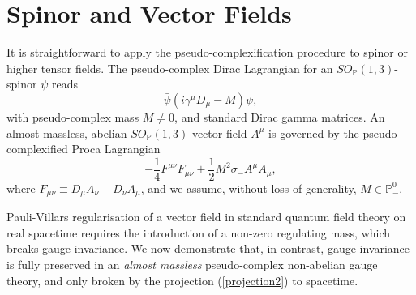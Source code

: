 \documentclass[a4paper,aps,prd,showkeys,showpacs,superscriptaddress,preprint]{revtex4}
\newcommand{\pc}{\mathbb{P}}
\begin{document}
\section{Spinor and Vector Fields\label{sec_gaugetheory}}
It is straightforward to apply the pseudo-complexification
procedure to spinor or higher tensor fields. The pseudo-complex Dirac
Lagrangian for an $SO_\pc(1,3)$-spinor $\psi$ reads
\begin{equation}
  \bar \psi(i \gamma^\mu D_\mu - M) \psi,
\end{equation}
with pseudo-complex mass $M\neq 0$, and standard Dirac gamma
matrices. An almost massless, abelian $SO_\pc(1,3)$-vector field
$A^\mu$ is governed by the pseudo-complexified Proca Lagrangian
\begin{equation}
  -\frac{1}{4} F^{\mu\nu}F_{\mu\nu} + \frac{1}{2} M^2 \sigma_- A^\mu A_\mu,
\end{equation} 
where $F_{\mu\nu} \equiv D_\mu A_\nu - D_\nu A_\mu$, and we assume,
without loss of generality, $M \in \pc^0_-$. 

Pauli-Villars regularisation of a vector field in standard quantum
field theory on real spacetime requires the introduction of a non-zero
regulating mass, which breaks gauge invariance. 
We now demonstrate that, in contrast, gauge invariance is fully
preserved in an \textsl{almost massless} pseudo-complex non-abelian gauge theory,
and only broken by the projection (\ref{projection2}) to spacetime.
\end{document}
